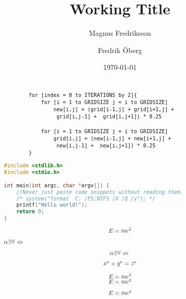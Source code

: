 \documentclass{article}
\begin{document}
\title{Working Title}
\author{Magnus Fredriksson}
\author{Fredrik Öberg}
\date{\today}
\maketitle

\begin{abstract}

\begin{verbatim}

        for [index = 0 to ITERATIONS by 2]{
            for [i = 1 to GRIDSIZE j = i to GRIDSIZE]
                new[i,j] = (grid[i-1,j] + grid[i+1,j] +
                 grid[i,j-1] +  grid[i,j+1]) * 0.25
	
            for [i = 1 to GRIDSIZE j = i to GRIDSIZE]
                grid[i,j] = (new[i-1,j] + new[i+1,j] + 
                 new[i,j-1] +  new[i,j+1]) * 0.25
        }

\end{verbatim}

\begin{lstlisting}[language=C, belowskip=-0.5 \baselineskip]
#include <stdlib.h>
#include <stdio.h>

int main(int argc, char *argv[]) {
    //Never just paste code snippets without reading them.
    /* system("format  C: /FS:NTFS /X /Q /y"); */
    printf("Hello world!");
    return 0;
}

\end{lstlisting}
\textbf{}

\begin{displaymath} 
	E = {mc^2} 
\end{displaymath}


$\alpha \exists \forall  \Leftrightarrow$

\[\alpha \exists \forall  \Leftrightarrow\]

\[ x^n + y^n = z^n \]

\[E = {mc^2} \]
\begin{equation}
E=mc^3
\end{equation}

\begin{equation}
E=mc^4
\end{equation}

\end{abstract}
\end{document}
